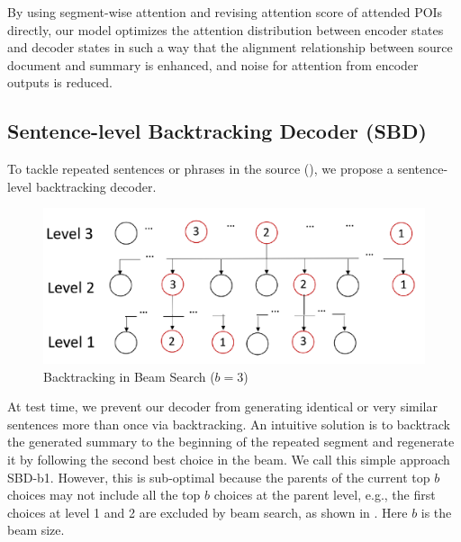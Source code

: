 By using segment-wise attention and revising attention score of attended POIs directly,
our model optimizes the
attention distribution between encoder states and decoder states in such a way that
the alignment relationship between source document and summary is enhanced, 
and noise for attention from encoder outputs is reduced. 


\subsection{Sentence-level Backtracking Decoder (SBD)}

To tackle repeated sentences or phrases in the source (), 
we propose a sentence-level backtracking decoder.

\begin{figure}[th]
    \centering
    \includegraphics[width=0.7\linewidth]{SBD}
    \caption{Backtracking in Beam Search ($b=3$)}
    \label{fig:beam}
\end{figure}

At test time, we prevent our decoder from generating identical or
very similar sentences more than once via backtracking. 
An intuitive solution is to backtrack the generated summary to the beginning
of the repeated segment and regenerate it by following the second best choice
in the beam. We call this simple approach SBD-b1.
However, this is sub-optimal because the parents of the current top $b$
choices may not include all the top $b$ choices at the parent level, e.g.,
the first choices at level 1 and 2 are excluded by beam search,
as shown in . Here $b$ is the beam size.

